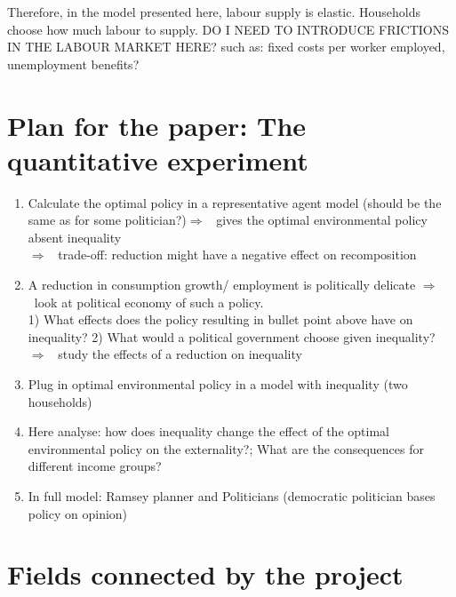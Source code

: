 \documentclass[12pt]{article}
\newcommand{\ar}{$\Rightarrow$ \ }
\begin{document}
Therefore, in the model presented here, labour supply is elastic. Households choose how much labour to supply. DO I NEED TO INTRODUCE FRICTIONS IN THE LABOUR MARKET HERE? such as: fixed costs per worker employed, unemployment benefits? 



\section{Plan for the paper: The quantitative experiment}
\begin{enumerate}
\item Calculate the optimal policy in a representative agent model (should be the same as for some politician?)\ar gives the optimal environmental policy absent inequality\\
\ar trade-off: reduction might have a negative effect on recomposition


\item A reduction in consumption growth/ employment is politically delicate \ar look at political economy of such a policy. \\
1) What effects does the policy resulting in bullet point above have on inequality?
2) What would a political government choose given inequality? 
\ar study the effects of a reduction on inequality

\item Plug in optimal environmental policy in a model with inequality (two households) 
\item Here analyse: how does inequality change the effect of the optimal environmental policy on the externality?; What are the consequences for different income groups?
\item In full model: Ramsey planner and Politicians (democratic politician bases policy on opinion) 
\end{enumerate}
\section{Fields connected by the project}
\end{document}
